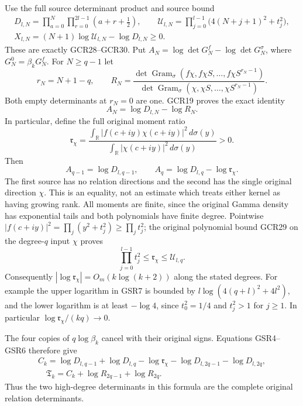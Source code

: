 Use the full source determinant product and source bound
\[
\begin{gathered}
 D_{l,N}=\prod_{a=0}^N\prod_{r=0}^{2l-1}(a+r+\tfrac12),\qquad
 \mathscr U_{l,N}=\prod_{j=0}^{l-1}
                         \bigl(4(N+j+1)^2+t_j^2\bigr),\\
 X_{l,N}=(N+1)\log\mathscr U_{l,N}-\log D_{l,N}\geq0.
\end{gathered}\tag{GSR2}
\]
These are exactly GCR28--GCR30. Put
$A_N=\log\det G_N^f-\log\det G_N^\sigma$, where $G_N^0=\beta_kG_N^f$.
For $N\geq q-1$ let
\[
 r_N=N+1-q,\qquad
 R_N=
 \frac{\det\operatorname{Gram}_\sigma
                 (f\chi,f\chi S,\ldots,f\chi S^{r_N-1})}
      {\det\operatorname{Gram}_\sigma
                 (\chi,\chi S,\ldots,\chi S^{r_N-1})}.
\tag{GSR3}
\]
Both empty determinants at $r_N=0$ are one. GCR19 proves
the exact identity
\[
 A_N=\log D_{l,N}-\log R_N.
\tag{GSR4}
\]
In particular, define the full original moment ratio
\[
 \mathfrak r_\chi=
 \frac{\displaystyle\int_{\mathbb R}
              |f(c+iy)\chi(c+iy)|^2\,d\sigma(y)}
      {\displaystyle\int_{\mathbb R}
              |\chi(c+iy)|^2\,d\sigma(y)}>0.
\tag{GSR5}
\]
Then
\[
 A_{q-1}=\log D_{l,q-1},\qquad
 A_q=\log D_{l,q}-\log\mathfrak r_\chi.
\tag{GSR6}
\]
The first source has no relation directions and the second
has the single original direction $\chi$. This is an equality,
not an estimate which treats either kernel as having growing rank.
All moments are finite, since the original Gamma density has
exponential tails and both polynomials have finite degree.
Pointwise $|f(c+iy)|^2=\prod_j(y^2+t_j^2)\geq\prod_jt_j^2$;
the original polynomial bound GCR29 on the degree-$q$ input
$\chi$ proves
\[
 \prod_{j=0}^{l-1}t_j^2\leq\mathfrak r_\chi\leq\mathscr U_{l,q}.
\tag{GSR7}
\]
Consequently $|\log\mathfrak r_\chi|=O_m(k\log(k+2))$ along
the stated degrees. For example the upper logarithm in GSR7
is bounded by
$l\log(4(q+l)^2+4l^2)$, and the lower logarithm is at least
$-\log4$, since $t_0^2=1/4$ and $t_j^2>1$ for $j\geq1$.
In particular $\log\mathfrak r_\chi/(kq)\to0$.

The four copies of $q\log\beta_k$ cancel with their original
signs. Equations GSR4--GSR6 therefore give
\[
\begin{gathered}
 C_k=\log D_{l,q-1}+\log D_{l,q}-\log\mathfrak r_\chi
                     -\log D_{l,2q-1}-\log D_{l,2q},\\
 \boxed{\quad \mathfrak T_k=C_k+\log R_{2q-1}+\log R_{2q}.\quad}
\end{gathered}
\tag{GSR8}
\]
Thus the two high-degree determinants in this formula are the
complete original relation determinants.


